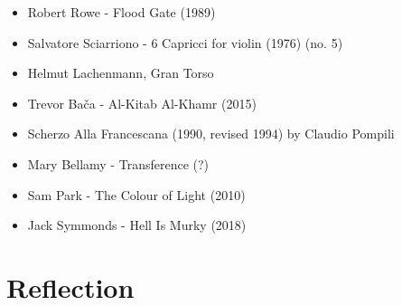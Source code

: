 \begin{itemize}

    \item Robert Rowe - Flood Gate (1989)

    \item Salvatore Sciarriono - 6 Capricci for violin (1976) (no. 5)

    \item Helmut Lachenmann, Gran Torso

    \item Trevor Bača - Al-Kitab Al-Khamr (2015)

    \item Scherzo Alla Francescana (1990, revised 1994) by Claudio Pompili 

    \item Mary Bellamy - Transference (?)

    \item Sam Park - The Colour of Light (2010)

    \item Jack Symmonds - Hell Is Murky (2018)

\end{itemize}

\section{Reflection}




\lipsum[4]